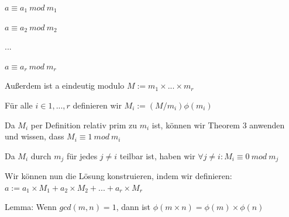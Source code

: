 \documentclass[a4paper]{article}
\begin{document}
\begin{multicols}{3}
\begin{itemize*}
\begin{itemize*}
                  \begin{itemize*}
                        \item $a\equiv a_1\ mod\ m_1$
                        \item $a\equiv a_2\ mod\ m_2$
                        \item ...
                        \item $a\equiv a_r\ mod\ m_r$
                  \end{itemize*}
                  \item Außerdem ist a eindeutig modulo $M := m_1\times ...\times m_r$
                  \item Für alle $i\in{1,...,r}$ definieren wir $M_i:=(M/m_i)\phi(m_i)$
                  \item Da $M_i$ per Definition relativ prim zu $m_i$ ist, können wir Theorem 3 anwenden und wissen, dass $M_i\equiv 1\ mod\ m_i$
                  \item Da $M_i$ durch $m_j$ für jedes $j\not= i$ teilbar ist, haben wir $\forall j\not= i:M_i\equiv 0\ mod\ m_j$ \item Wir können nun die Lösung konstruieren, indem wir definieren: $a:= a_1\times M_1+a_2\times M_2+...+a_r\times M_r$
            \end{itemize*}
            \item Lemma: Wenn $gcd(m,n)=1$, dann ist $\phi(m\times n)=\phi(m)\times \phi(n)$

\end{itemize*}
\end{multicols}
\end{document}
